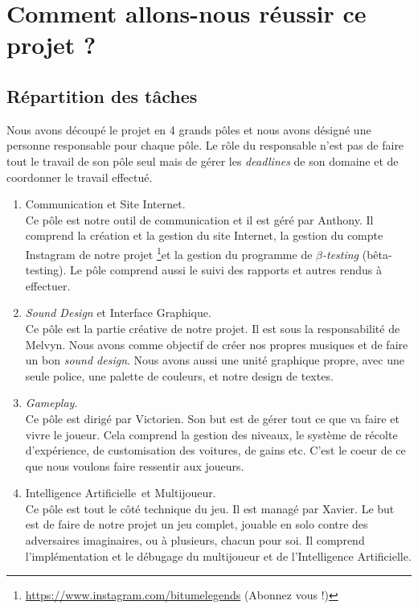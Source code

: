 \documentclass[12pt,a4paper]{article}
\newcommand{\AI}{Intelligence Artificielle}
\begin{document}
\section{Comment allons-nous réussir ce projet ?}
\subsection{Répartition des tâches} 
Nous avons découpé le projet en 4 grands pôles et nous avons désigné une personne responsable
pour chaque pôle. Le rôle du responsable n'est pas de faire tout le travail de son pôle seul mais
de gérer les \textit{deadlines} de son domaine et de coordonner le travail effectué.\\
\begin{enumerate}
    \item Communication et Site Internet.\\
        Ce pôle est notre outil de communication et il est géré par Anthony. Il comprend la création
        et la gestion du site Internet, la gestion du compte Instagram de notre projet \footnote{\url{https://www.instagram.com/bitumelegends} (Abonnez vous !)}et la
        gestion du programme de \(\beta\)\textit{-testing} (bêta-testing). Le pôle comprend aussi le suivi
        des rapports et autres rendus à effectuer.
        \\
    \item \textit{Sound Design} et Interface Graphique.\\
        Ce pôle est la partie créative de notre projet. Il est sous la responsabilité de Melvyn.
        Nous avons comme objectif de créer nos propres musiques et de faire un bon \textit{sound design}.
        Nous avons aussi une unité graphique propre, avec une seule police, une palette de couleurs, et notre
        design de textes.
        \\
    \item \textit{Gameplay}.\\
        Ce pôle est dirigé par Victorien.
        Son but est de gérer tout ce que va faire et vivre le joueur. Cela comprend la gestion des niveaux,
        le système de récolte d'expérience, de customisation des voitures, de gains etc. C'est le coeur 
        de ce que nous voulons faire ressentir aux joueurs.
        \\
    \item \AI\, et Multijoueur.\\
        Ce pôle est tout le côté technique du jeu. Il est managé par Xavier. Le but est de faire de notre projet
        un jeu complet, jouable en solo contre des adversaires imaginaires, ou à plusieurs, chacun pour soi. Il 
        comprend l'implémentation et le débugage du multijoueur et de l'\AI.
\end{enumerate}
\clearpage
\end{document}
